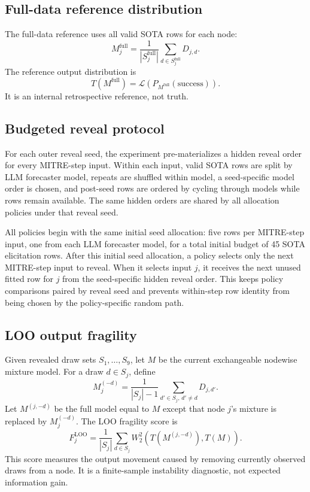 \documentclass[11pt]{article}
\newcommand{\law}{\mathcal{L}}
\newcommand{\wtsq}{W_2^2}
\begin{document}
\subsection{Full-data reference distribution}

The full-data reference uses all valid SOTA rows for each node:
\[
M_j^{\mathrm{full}}
=
\frac{1}{|S_j^{\mathrm{full}}|}
\sum_{d\in S_j^{\mathrm{full}}}D_{j,d}.
\]
The reference output distribution is
\[
T(M^{\mathrm{full}})=\law\left(P_{M^{\mathrm{full}}}(\mathrm{success})\right).
\]
It is an internal retrospective reference, not truth.

\subsection{Budgeted reveal protocol}

For each outer reveal seed, the experiment pre-materializes a hidden reveal order for every MITRE-step input. Within each input, valid SOTA rows are split by LLM forecaster model, repeats are shuffled within model, a seed-specific model order is chosen, and post-seed rows are ordered by cycling through models while rows remain available. The same hidden orders are shared by all allocation policies under that reveal seed.

All policies begin with the same initial seed allocation: five rows per MITRE-step input, one from each LLM forecaster model, for a total initial budget of 45 SOTA elicitation rows. After this initial seed allocation, a policy selects only the next MITRE-step input to reveal. When it selects input \(j\), it receives the next unused fitted row for \(j\) from the seed-specific hidden reveal order. This keeps policy comparisons paired by reveal seed and prevents within-step row identity from being chosen by the policy-specific random path.

\subsection{LOO output fragility}

Given revealed draw sets \(S_1,\ldots,S_9\), let \(M\) be the current exchangeable nodewise mixture model. For a draw \(d\in S_j\), define
\[
M_j^{(-d)}
=
\frac{1}{|S_j|-1}
\sum_{d'\in S_j,\,d'\neq d}D_{j,d'}.
\]
Let \(M^{(j,-d)}\) be the full model equal to \(M\) except that node \(j\)'s mixture is replaced by \(M_j^{(-d)}\). The LOO fragility score is
\[
F_j^{\mathrm{LOO}}
=
\frac{1}{|S_j|}
\sum_{d\in S_j}
\wtsq\left(T(M^{(j,-d)}),T(M)\right).
\]
This score measures the output movement caused by removing currently observed draws from a node. It is a finite-sample instability diagnostic, not expected information gain.
\end{document}

